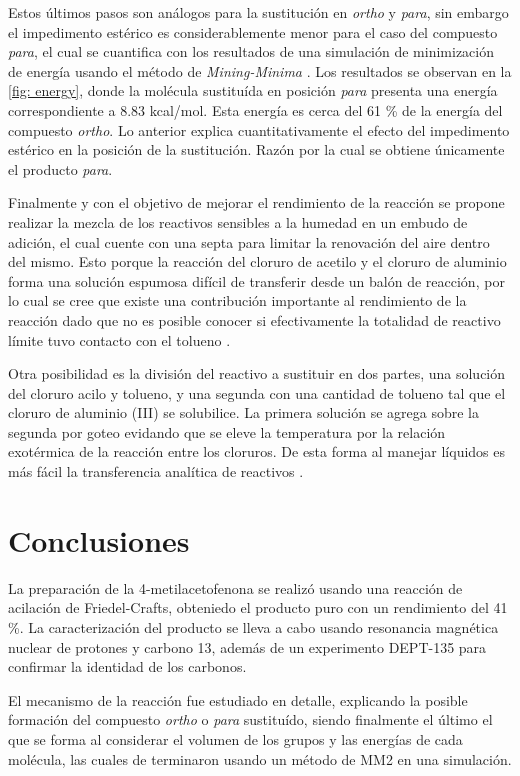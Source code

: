 \documentclass[fleqn,11pt]{SelfArx}
\begin{document}
Estos últimos pasos son análogos para la sustitución en \textit{ortho} y \textit{para}, sin embargo el impedimento estérico es considerablemente menor para el caso del compuesto \textit{para}, el cual se cuantifica con los resultados de una simulación de minimización de energía usando el método de \textit{Mining-Minima} \cite{Huang2012}. Los resultados se observan en la \autoref{fig: energy}, donde la molécula sustituída en posición \textit{para} presenta una energía correspondiente a 8.83 kcal/mol. Esta energía es cerca del 61 \% de la energía del compuesto \textit{ortho}. Lo anterior explica cuantitativamente el efecto del impedimento estérico en la posición de la sustitución. Razón por la cual se obtiene únicamente el producto \textit{para}.

Finalmente y con el objetivo de mejorar el rendimiento de la reacción se propone realizar la mezcla de los reactivos sensibles a la humedad en un embudo de adición, el cual cuente con una septa para limitar la renovación del aire dentro del mismo. Esto porque la reacción del cloruro de acetilo y el cloruro de aluminio forma una solución espumosa difícil de transferir desde un balón de reacción, por lo cual se cree que existe una contribución importante al rendimiento de la reacción dado que no es posible conocer si efectivamente la totalidad de reactivo límite tuvo contacto con el tolueno \cite{West2008}.
\newpage

Otra posibilidad es la división del reactivo a sustituir en dos partes, una solución del cloruro acilo y tolueno, y una segunda con una cantidad de tolueno tal que el cloruro de aluminio (III) se solubilice. La primera solución se agrega sobre la segunda por goteo evidando que se eleve la temperatura por la relación exotérmica de la reacción entre los cloruros. De esta forma al manejar líquidos es más fácil la transferencia analítica de reactivos \cite{Dunathan1964}.
 
\section{Conclusiones}
La preparación de la 4-metilacetofenona se realizó usando una reacción de acilación de Friedel-Crafts, obteniedo el producto puro con un rendimiento del 41 \%. La caracterización del producto se lleva a cabo usando resonancia magnética nuclear de protones y carbono 13, además de un experimento DEPT-135 para confirmar la identidad de los carbonos.

El mecanismo de la reacción fue estudiado en detalle, explicando la posible formación del compuesto \textit{ortho} o \textit{para} sustituído, siendo finalmente el último el que se forma al considerar el volumen de los grupos y las energías de cada molécula, las cuales de terminaron usando un método de MM2 en una simulación. 
\end{document}
